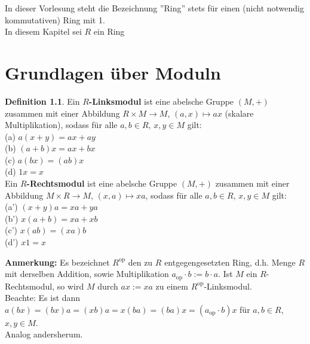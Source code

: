 \documentclass[10pt,a4paper,numbers=endperiod]{scrreprt}
\theoremstyle{definition}
\newtheorem{defi}[satz]{Definition}
\begin{document}
In dieser Vorlesung steht die Bezeichnung ''Ring'' stets für einen (nicht notwendig kommutativen) Ring mit 1.\\ 
In diesem Kapitel sei $R$ ein Ring

\chapter{Grundlagen über Moduln} 
\onehalfspacing

\begin{defi}
	Ein \textbf{$R$-Linksmodul} ist eine abelsche Gruppe $(M, +)$ zusammen mit einer Abbildung $R \times M \rightarrow M$, $(a,x) \mapsto ax$ (skalare Multiplikation), sodass für alle $a, b \in R$, $x, y \in M$ gilt:\\
	(a) $a(x+y) = ax + ay$\\
	(b) $(a+b)x = ax + bx$\\
	(c) $a(bx) = (ab)x$\\
	(d) $1x = x$\\
	Ein \textbf{$R$-Rechtsmodul} ist eine abelsche Gruppe $(M, +)$ zusammen mit einer Abbildung $M \times R \rightarrow M$, $(x,a) \mapsto xa$, sodass für alle $a, b \in R$, $x,y \in M$ gilt:\\
	(a') $(x+y)a = xa + ya$\\
	(b') $x(a+b) = xa + xb$\\
	(c') $x(ab) = (xa)b$\\
	(d') $x1 = x$
\end{defi}

\textbf{Anmerkung:} Es bezeichnet $R^{\text{op}}$ den zu $R$ entgegengesetzten Ring, d.h. Menge $R$ mit derselben Addition, sowie Multiplikation $a_{\text{op}} \cdot b := b\cdot a$. Ist $M$ ein $R$-Rechtsmodul, so wird $M$ durch $ax := xa$ zu einem $R^{\text{op}}$-Linksmodul.\\
Beachte: Es ist dann $a(bx) = (bx)a = (xb)a = x(ba) = (ba)x = (a_{\text{op}}\cdot b)x$ für $a,b \in R$, $x, y \in M$.\\
Analog andersherum.\\
\end{document}
